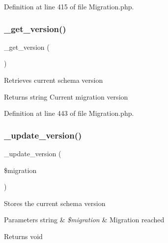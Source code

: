 Definition at line 415 of file Migration.\+php.

\mbox{\label{class_c_i___migration_a1de42592aaef750bc3782e873b1b6d5f}} 
\subsubsection{\texorpdfstring{\_get\_version()}{\_get\_version()}}
{\footnotesize\ttfamily \+\_\+get\+\_\+version (\begin{DoxyParamCaption}{ }\end{DoxyParamCaption})\hspace{0.3cm}{\ttfamily [protected]}}

Retrieves current schema version

\begin{DoxyReturn}{Returns}
string Current migration version 
\end{DoxyReturn}


Definition at line 443 of file Migration.\+php.

\mbox{\label{class_c_i___migration_a6eb30e31b93e1cf882527be723d52fcd}} 
\subsubsection{\texorpdfstring{\_update\_version()}{\_update\_version()}}
{\footnotesize\ttfamily \+\_\+update\+\_\+version (\begin{DoxyParamCaption}\item[{}]{\$migration }\end{DoxyParamCaption})\hspace{0.3cm}{\ttfamily [protected]}}

Stores the current schema version


\begin{DoxyParams}[1]{Parameters}
string & {\em \$migration} & Migration reached \\
\hline
\end{DoxyParams}
\begin{DoxyReturn}{Returns}
void 
\end{DoxyReturn}


